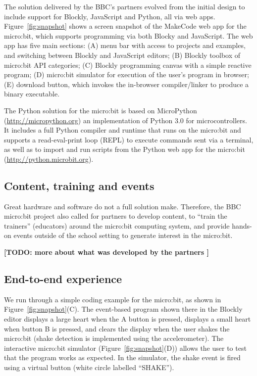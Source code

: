 

The solution delivered by the BBC's partners evolved from the initial
design to include support for Blockly, JavaScript and Python, all
via web apps.
Figure~\ref{fig:snapshot} shows a screen snapshot of the MakeCode web app
for the micro:bit,
which supports programming via both Blocky and JavaScript.
The web app has five main sections: (A) menu bar with access to projects
and examples, and switching between Blockly and JavaScript editors; (B)
Blockly toolbox of micro:bit API categories; (C) Blockly programming
canvas with a simple reactive program; (D) micro:bit simulator for execution
of the user's program in browser; (E) download button, which invokes the in-browser
compiler/linker to produce a binary executable.

The Python solution for the micro:bit is based on MicroPython (\url{http://micropython.org})
an implementation of Python 3.0 for microcontrollers. It includes
a full Python compiler and runtime that runs on the micro:bit and
supports a read-eval-print loop (REPL) to execute commands sent via
a terminal, as well as to import and run scripts from the Python web app for
the micro:bit (\url{http://python.microbit.org}).

\subsection{Content, training and events}

Great hardware and software do not a full solution make. Therefore,
the BBC micro:bit project also called for partners to develop content,
to ``train the trainers'' (educators) around the micro:bit computing
system, and provide hands-on events outside of the school setting to
generate interest in the micro:bit.

{\bf [TODO: more about what was developed by the partners ]}

\subsection{End-to-end experience}

We run through a simple coding example for the micro:bit, as shown
in Figure~\ref{fig:snapshot}(C). The event-based program shown there
in the Blockly editor displays a large heart when the
A button is pressed, displays a small heart when button B is pressed,
and clears the display when the user shakes the micro:bit (shake
detection is implemented using the accelerometer). The interactive
micro:bit simulator
(Figure~\ref{fig:snapshot}(D)) allows the user to test that
the program works as expected. In the simulator, the
shake event is fired using a virtual button (white circle labelled
``SHAKE'').

